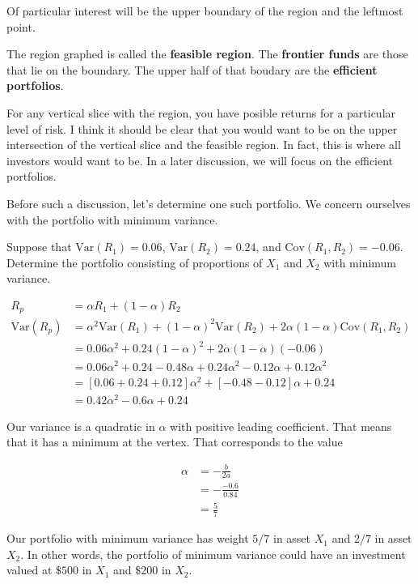 \documentclass{ximera}
\begin{document}
Of particular interest will be the upper boundary of the region and the leftmost point.

\begin{definition}
The region graphed is called the {\bf feasible region}. The {\bf frontier funds} are those that lie on the boundary. The upper half of that boudary are the {\bf efficient portfolios}. 
\end{definition}

For any vertical slice with the region, you have posible returns for a particular level of risk. I think it should be clear that you would want to be on the upper intersection of the vertical slice and the feasible region. In fact, this is where all investors would want to be. In a later discussion, we will focus on the efficient portfolios. 

Before such a discussion, let's determine one such portfolio. We concern ourselves with the portfolio with minimum variance.

\begin{example}
Suppose that $\text{Var}(R_1)=0.06$, $\text{Var}(R_2)=0.24$, and $\text{Cov}(R_1, R_2)=-0.06$. Determine the portfolio consisting of proportions of $X_1$ and $X_2$ with minimum variance.
\end{example}

\begin{solution}
	\begin{align*}
	R_p 			&=\alpha R_1+(1-\alpha)R_2\\
	\text{Var}(R_p)	&=\alpha^2\text{Var}(R_1)+(1-\alpha)^2\text{Var}(R_2)+2\alpha(1-\alpha)\text{Cov}(R_1, R_2)\\
				&=0.06\alpha^2+0.24(1-\alpha)^2+2\alpha(1-\alpha)(-0.06)\\
				&=0.06\alpha^2+0.24-0.48\alpha+0.24\alpha^2-0.12\alpha+0.12\alpha^2\\
				&=[0.06+0.24+0.12]\alpha^2+[-0.48-0.12]\alpha+0.24\\
				&=0.42\alpha^2-0.6\alpha+0.24
	\end{align*}

Our variance is a quadratic in $\alpha$ with positive leading coefficient. That means that it has a minimum at the vertex. That corresponds to the value

	\begin{align*}
	\alpha	&=-\frac{b}{2a}\\
		&=-\frac{-0.6}{0.84}\\
		&=\frac{5}{7}
	\end{align*}

Our portfolio with minimum variance has weight $5/7$ in asset $X_1$ and $2/7$ in asset $X_2$. In other words, the portfolio of minimum variance could have an investment valued at $\$500$ in $X_1$ and $\$200$ in $X_2$. 
\end{solution}
\end{document}
